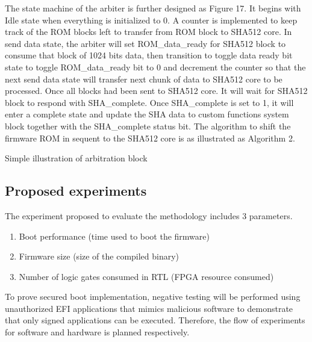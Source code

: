 \documentclass[review]{elsarticle}
\begin{document}
The state machine of the arbiter is further designed as Figure 17. It begins with Idle state when everything is initialized to 0. A counter is implemented to keep track of the ROM blocks left to transfer from ROM block to SHA512 core. In send data state, the arbiter will set ROM\_data\_ready for SHA512 block to consume that block of 1024 bits data, then transition to toggle data ready bit state to toggle ROM\_data\_ready bit to 0 and decrement the counter so that the next send data state will transfer next chunk of data to SHA512 core to be processed. Once all blocks had been sent to SHA512 core. It will wait for SHA512 block to respond with SHA\_complete. Once SHA\_complete is set to 1, it will enter a complete state and update the SHA data to custom functions system block together with the SHA\_complete status bit. The algorithm to shift the firmware ROM in sequent to the SHA512 core is as illustrated as Algorithm 2.


\begin{algorithm} [H]
 \caption{Simple illustration of arbitration block}

\end{algorithm}

\subsection{ Proposed experiments}
The experiment proposed to evaluate the methodology includes 3 parameters.
\begin{enumerate}
\itemsep=-1pt 		%
\itemindent=0pt 	%
\item 
Boot performance (time used to boot the firmware)
\item 
Firmware size (size of the compiled binary)
\item 
Number of logic gates consumed in RTL (FPGA resource consumed)
\end{enumerate}

To prove secured boot implementation, negative testing will be performed using unauthorized EFI applications that mimics malicious software to demonstrate that only signed applications can be executed. Therefore, the flow of experiments for software and hardware is planned respectively.
\end{document}
